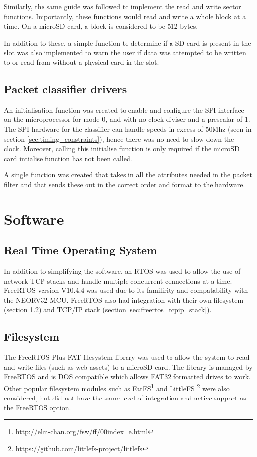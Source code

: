 Similarly, the same guide was followed to implement the read and write sector functions. Importantly, these functions would read and write a whole block at a time. On a microSD card, a block is considered to be 512 bytes. 


In addition to these, a simple function to determine if a SD card is present in the slot was also implemented to warn the user if data was attempted to be written to or read from without a physical card in the slot. 





\subsection{Packet classifier drivers}
\label{sec:packet_filter_driver}
An initialisation function was created to enable and configure the SPI interface on the microprocessor for mode 0, and with no clock diviser and a prescalar of 1. The SPI hardware for the classifier can handle speeds in excess of 50Mhz (seen in section \ref{sec:timing_constraints}), hence there was no need to slow down the clock. Moreover, calling this initialise function is only required if the microSD card intialise function has not been called. 

A single function was created that takes in all the attributes needed in the packet filter and that sends these out in the correct order and format to the hardware. 








\section{Software}

\subsection{Real Time Operating System}
In addition to simplifying the software, an RTOS was used to allow the use of network TCP stacks and handle multiple concurrent connections at a time. FreeRTOS version V10.4.4 was used due to its familirity and compatability with the NEORV32 MCU. FreeRTOS also had integration with their own filesystem (section \ref{sec:freertos_filesystem}) and TCP/IP stack (section \ref{sec:freertos_tcpip_stack}).

\subsection{Filesystem}
\label{sec:freertos_filesystem}
The FreeRTOS-Plus-FAT filesystem library was used to allow the system to read and write files (such as web assets) to a microSD card. The library is managed by FreeRTOS and is DOS compatible which allows FAT32 formatted drives to work. Other popular filesystem modules such as FatFS\footnote[1]{http://elm-chan.org/fsw/ff/00index\_e.html} and LittleFS \footnote[2]{https://github.com/littlefs-project/littlefs} were also considered, but did not have the same level of integration and active support as the FreeRTOS option. 

